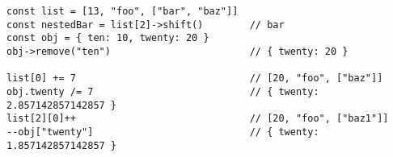 \vspace{-2.5em}
\begin{center}
\begin{minipage}[t]{1\textwidth}
\begin{listing}[H]
\begin{spacing}{0.6}
\begin{verbatim}
const list = [13, "foo", ["bar", "baz"]]
const nestedBar = list[2]->shift()        // bar
const obj = { ten: 10, twenty: 20 }
obj->remove("ten")                        // { twenty: 20 }

list[0] += 7                              // [20, "foo", ["baz"]]
obj.twenty /= 7                           // { twenty: 2.857142857142857 }
list[2][0]++                              // [20, "foo", ["baz1"]]
--obj["twenty"]                           // { twenty: 1.857142857142857 }
\end{verbatim}
\end{spacing}
\end{listing}
\end{minipage}
\end{center}
